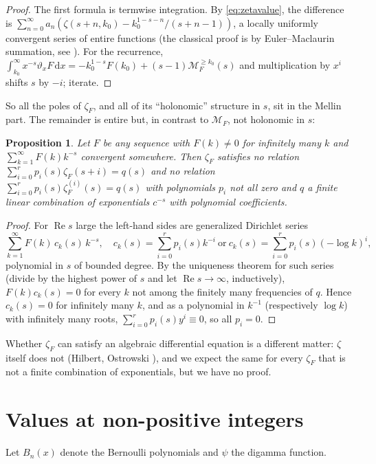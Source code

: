 \documentclass[11pt,reqno]{amsart}
\newtheorem{proposition}[theorem]{Proposition}
\theoremstyle{definition}
\theoremstyle{remark}
\newcommand{\dd}{\,\mathrm{d}}
\begin{document}
\begin{proof}
The first formula is termwise integration. By \eqref{eq:zetavalue}, the difference is
$\sum_{n=0}^{\infty}a_n(\zeta(s+n,k_0) - k_0^{1-s-n}/(s+n-1))$, a locally uniformly convergent series of entire
functions (the classical proof is by Euler--Maclaurin summation, see \cite[Section~5.5]{Joh26}).
For the recurrence, $\int_{k_0}^\infty x^{-s}\vartheta_xF\dd x = -k_0^{1-s}F(k_0) + (s-1)\mathcal M_F^{\ge k_0}(s)$ and multiplication by
$x^i$ shifts $s$ by $-i$; iterate.
\end{proof}

So all the poles of $\zeta_F$, and all of its ``holonomic'' structure in $s$, sit in the Mellin part. The
remainder is entire but, in contrast to $\mathcal M_F$, not holonomic in $s$:

\begin{proposition}\label{prop:nonholonomic}
Let $F$ be any sequence with $F(k) \ne 0$ for infinitely many $k$ and $\sum_{k=1}^{\infty}F(k)k^{-s}$ convergent somewhere.
Then $\zeta_F$ satisfies no relation $\sum_{i=0}^rp_i(s)\zeta_F(s+i) = q(s)$ and no relation
$\sum_{i=0}^rp_i(s)\zeta_F^{(i)}(s) = q(s)$ with polynomials $p_i$ not all zero and $q$ a finite
linear combination of exponentials $c^{-s}$ with polynomial coefficients.
\end{proposition}

\begin{proof}
For $\operatorname{Re}s$ large the left-hand sides are generalized Dirichlet series
\[
  \sum_{k=1}^{\infty} F(k)\,c_k(s)\,k^{-s}, \quad c_k(s) = \sum_{i=0}^{r}p_i(s)k^{-i}
  \ \text{or}\ c_k(s) = \sum_{i=0}^{r}p_i(s)(-\log k)^i,
\]
polynomial in $s$ of bounded degree. By the uniqueness theorem for such series (divide by the highest power of
$s$ and let $\operatorname{Re}s\to\infty$, inductively), $F(k)c_k(s) = 0$ for every $k$ not among the finitely many
frequencies of $q$. Hence $c_k(s) = 0$ for infinitely many $k$, and as a polynomial in $k^{-1}$ (respectively
$\log k$) with infinitely many roots, $\sum_{i=0}^{r}p_i(s)y^i \equiv 0$, so all $p_i = 0$.
\end{proof}

Whether $\zeta_F$ can satisfy an algebraic differential equation is a different matter: $\zeta$ itself does not
(Hilbert, Ostrowski \cite{Ost20}), and we expect the same for every $\zeta_F$ that is not a finite combination of
exponentials, but we have no proof.

\section{Values at non-positive integers}
Let $B_n(x)$ denote the Bernoulli polynomials and $\psi$ the digamma function.
\end{document}
